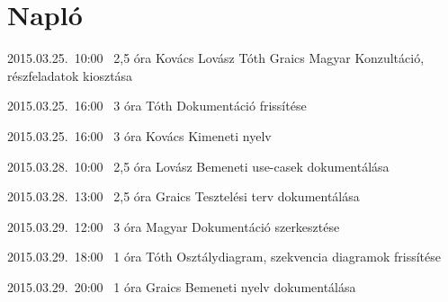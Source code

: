 %
\pagebreak
\section{Napló}

\begin{naplo}

\bejegyzes
{2015.03.25.~10:00~} %
{2,5 óra} %
{Kovács\newline
Lovász\newline
Tóth\newline
Graics\newline
Magyar
} %
{Konzultáció, részfeladatok kiosztása} %

\bejegyzes
{2015.03.25.~16:00~}
{3 óra}
{Tóth}
{Dokumentáció frissítése}

\bejegyzes
{2015.03.25.~16:00~}
{3 óra}
{Kovács}
{Kimeneti nyelv}

\bejegyzes
{2015.03.28.~10:00~}
{2,5 óra}
{Lovász}
{Bemeneti use-casek dokumentálása}

\bejegyzes
{2015.03.28.~13:00~}
{2,5 óra}
{Graics}
{Tesztelési terv dokumentálása}

\bejegyzes
{2015.03.29.~12:00~}
{3 óra}
{Magyar}
{Dokumentáció szerkesztése}

\bejegyzes
{2015.03.29.~18:00~}
{1 óra}
{Tóth}
{Osztálydiagram, szekvencia diagramok frissítése}

\bejegyzes
{2015.03.29.~20:00~}
{1 óra}
{Graics}
{Bemeneti nyelv dokumentálása}



\end{naplo}

